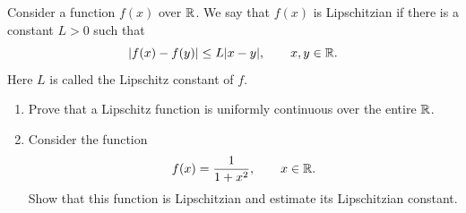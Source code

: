\begingroup
\renewcommand{\labelenumi}{(\alph{enumi})}
\begin{exercise}
  \label{ex:hw05:lipschitz-continuity}
  Consider a function $f(x)$ over $\mathbb{R}$. We say that $f(x)$ is
  Lipschitzian if there is a constant $L>0$ such that
  \[
    |f(x)-f(y)|\le L|x-y|,\qquad x,y\in\mathbb{R}.
  \]
  Here $L$ is called the Lipschitz constant of $f$.
  \begin{enumerate}
    \item Prove that a Lipschitz function is uniformly continuous over
      the entire $\mathbb{R}$.
    \item Consider the function
      \[
        f(x)=\frac{1}{1+x^2},\qquad x\in\mathbb{R}.
      \]
      Show that this function is Lipschitzian and estimate its
      Lipschitzian constant.
  \end{enumerate}
\end{exercise}
\endgroup
